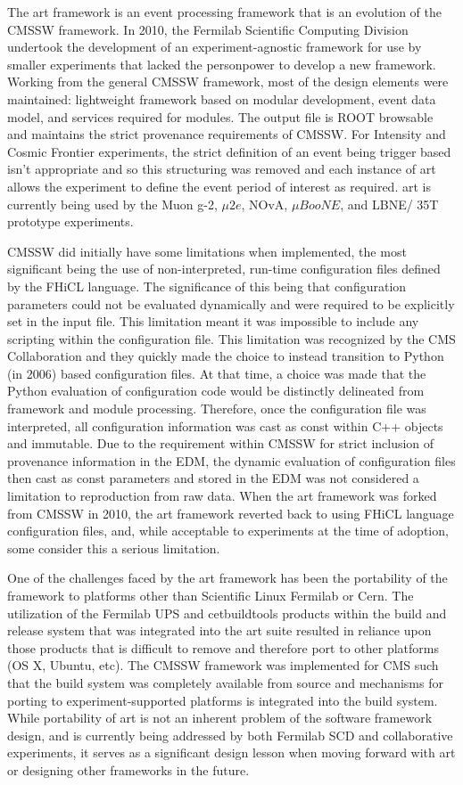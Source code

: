 The art framework is an event processing framework that is an evolution of the CMSSW framework. In 2010, the Fermilab Scientific Computing Division undertook the development of an experiment-agnostic framework for use by smaller experiments that lacked the personpower to develop a new framework. Working from the general CMSSW framework, most of the design elements were maintained: lightweight framework based on modular development, event data model, and services required for modules. The output file is ROOT browsable and maintains the strict provenance requirements of CMSSW. For Intensity and Cosmic Frontier experiments, the strict definition of an event being trigger based isn't appropriate and so this structuring was removed and each instance of art allows the experiment to define the event period of interest as required. art is currently being used by the Muon g-2, $\mu2e$, NOvA, $\mu BooNE$, and LBNE/ 35T prototype experiments.

CMSSW did initially have some limitations when implemented, the most significant being the use of non-interpreted, run-time configuration files defined by the FHiCL language. The significance of this being that configuration parameters could not be evaluated dynamically and were required to be explicitly set in the input file. This limitation meant it was impossible to include any scripting within the configuration file. This limitation was recognized by the CMS Collaboration and they quickly made the choice to instead transition to Python (in 2006) based configuration files. At that time, a choice was made that the Python evaluation of configuration code would be distinctly delineated from framework and module processing. Therefore, once the configuration file was interpreted, all configuration information was cast as const within C++ objects and immutable. Due to the requirement within CMSSW for strict inclusion of provenance information in the EDM, the dynamic evaluation of configuration files then cast as const parameters and stored in the EDM was not considered a limitation to reproduction from raw data. When the art framework was forked from CMSSW in 2010, the art framework reverted back to using FHiCL language configuration files, and, while acceptable to experiments at the time of adoption, some consider this a serious limitation.

One of the challenges faced by the art framework has been the portability of the framework to platforms other than Scientific Linux Fermilab or Cern. The utilization of the Fermilab UPS and cetbuildtools products within the build and release system that was integrated into the art suite resulted in reliance upon those products that is difficult to remove and therefore port to other platforms (OS X, Ubuntu, etc). The CMSSW framework was implemented for CMS such that the build system was completely available from source and mechanisms for porting to experiment-supported platforms is integrated into the build system. While portability of art is not an inherent problem of the software framework design, and is currently being addressed by both Fermilab SCD and collaborative experiments, it serves as a significant design lesson when moving forward with art or designing other frameworks in the future.

